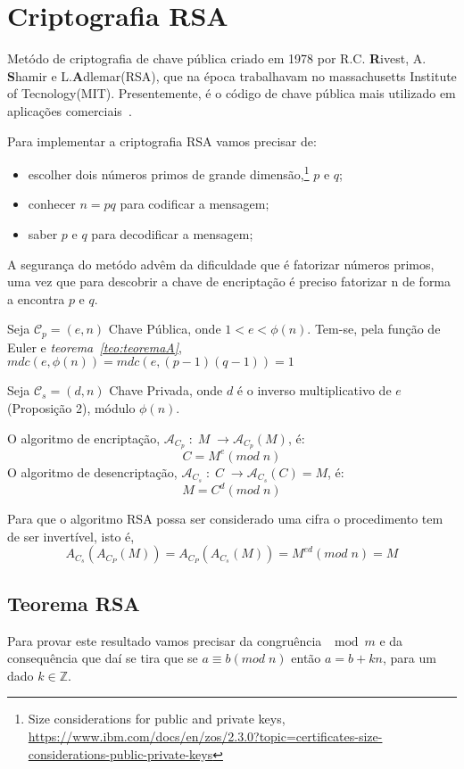  \chapter{Criptografia RSA}
\label{sec:criptografiaRSA}

Metódo de criptografia de chave pública criado em 1978 por R.C. \textbf{R}ivest, A. \textbf{S}hamir e L.\textbf{A}dlemar(RSA), que na época trabalhavam no massachusetts Institute of Tecnology(MIT). Presentemente, é o código de chave pública mais utilizado em aplicações comerciais~\cite{Coutinho2005}.

Para implementar a criptografia RSA vamos precisar de:
\begin{itemize}
    \item escolher dois  números primos de grande dimensão,\footnote{Size considerations for public and private keys, \url{https://www.ibm.com/docs/en/zos/2.3.0?topic=certificates-size-considerations-public-private-keys}} $p$ e $q$;
    \item conhecer $n=pq$ para codificar a mensagem;
    \item saber $p$ e $q$ para decodificar a mensagem;
\end{itemize}

A segurança do metódo advêm da dificuldade que é fatorizar números primos, uma vez que para descobrir a chave de encriptação é preciso fatorizar n de forma a encontra $p$ e $q$.

Seja $\mathcal{C}_p=(e,n)$ Chave Pública, onde $1 < e <\phi(n)$. Tem-se, pela função de Euler e \emph{teorema~\ref{teo:teoremaA}}, $mdc(e,\phi(n))=mdc(e,(p-1)(q-1))=1$

Seja $\mathcal{C}_s=(d,n)$  Chave Privada, onde $d$ é o inverso multiplicativo de $e$(Proposição 2), módulo $\phi(n)$.

O algoritmo de encriptação, $\mathcal{A}_{C_p} \;: \; M \; \to \mathcal{A}_{C_p}(M)$, é:
$$C=M^e(mod \; n)$$
O algoritmo de desencriptação, $\mathcal{A}_{C_s} \;: \; C \; \to \mathcal{A}_{C_s}(C)=M$, é:
$$M=C^d(mod \; n)$$

Para que o algoritmo RSA possa ser considerado uma cifra o procedimento tem de ser invertível, isto é,
$$A_{C_s}(A_{C_P}(M))=A_{C_P}(A_{C_s}(M))=M^{ed}(mod \; n)= M$$

\section{Teorema RSA}

Para provar este resultado vamos precisar da congruência $\mod m$ e da consequência que daí se tira que se $a \equiv b ( mod \; n)$ então $a=b +kn $, para um dado $k \in \mathbb{Z}$.

